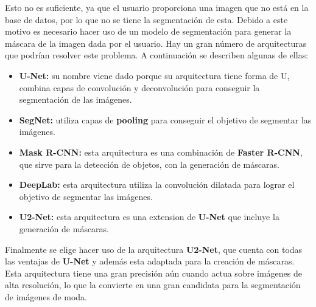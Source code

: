 \documentclass[12pt]{report} %
\begin{document}
	Esto no es suficiente, ya que el usuario proporciona una imagen que no está en la base de datos, por lo que no se tiene la segmentación de esta.
	Debido a este motivo es necesario hacer uso de un modelo de segmentación para generar la máscara de la imagen dada por el usuario.
	Hay un gran número de arquitecturas que podrían resolver este problema. A continuación se describen algunas de ellas:
	\begin{itemize}
		\item \textbf{U-Net:} su nombre viene dado porque su arquitectura tiene forma de U, combina capas de convolución y deconvolución para conseguir la segmentación de las imágenes.
		\item \textbf{SegNet:} utiliza capas de \textbf{pooling} para conseguir el objetivo de segmentar las imágenes.
		\item \textbf{Mask R-CNN:} esta arquitectura es una combinación de \textbf{Faster R-CNN}, que sirve para la detección de objetos, con la generación de máscaras.
		\item \textbf{DeepLab:} esta arquitectura utiliza la convolución dilatada para lograr el objetivo de segmentar las imágenes.
		\item \textbf{U2-Net:} esta arquitectura es una extension de \textbf{U-Net} que incluye la generación de máscaras.
	\end{itemize}


	Finalmente se elige hacer uso de la arquitectura \textbf{U2-Net}, que cuenta con todas las ventajas de \textbf{U-Net} y además esta 
	adaptada para la creación de máscaras. Esta arquitectura tiene una gran precisión aún cuando actua sobre imágenes de alta resolución,
	lo que la convierte en una gran candidata para la segmentación de imágenes de moda.
\end{document}

